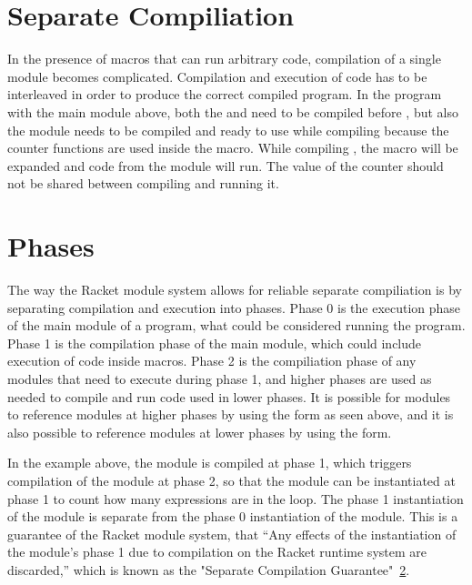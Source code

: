 \section{Separate Compiliation}
In the presence of macros that can run arbitrary code, compilation of a single module becomes complicated. 
Compilation and execution of code has to be interleaved in order to produce the correct compiled program.
In the program with the main module  above, both the  and  need to be compiled before , but also the  module needs to be compiled and ready to use while compiling  because the counter functions are used inside the  macro.
While compiling , the  macro will be expanded and code from the  module will run.
The value of the counter should not be shared between compiling  and running it.

\section{Phases}
The way the Racket module system allows for reliable separate compiliation is by separating compilation and execution into phases.
Phase 0 is the execution phase of the main module of a program, what could be considered running the program.
Phase 1 is the compilation phase of the main module, which could include execution of code inside macros. 
Phase 2 is the compiliation phase of any modules that need to execute during phase 1, and higher phases are used as needed to compile and run code used in lower phases.
It is possible for modules to reference modules at higher phases by using the  form as seen above, and it is also possible to reference modules at lower phases by using the  form.

In the example above, the  module is compiled at phase 1, which triggers compilation of the  module at phase 2, so that the  module can be instantiated at phase 1 to count how many expressions are in the  loop.
The phase 1 instantiation of the  module is separate from the phase 0 instantiation of the module.
This is a guarantee of the Racket module system, that ``Any effects of the instantiation of the module's phase 1 due to compilation on the Racket runtime system are discarded,'' which is known as the "Separate Compilation Guarantee"~\ref{}.


